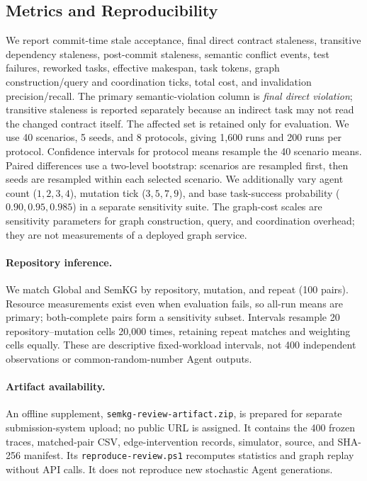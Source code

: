 \documentclass[a4paper,runningheads]{llncs}
\begin{document}
\subsection{Metrics and Reproducibility}
We report commit-time stale acceptance, final direct contract staleness, transitive dependency staleness, post-commit staleness, semantic conflict events, test failures, reworked tasks, effective makespan, task tokens, graph construction/query and coordination ticks, total cost, and invalidation precision/recall. The primary semantic-violation column is \emph{final direct violation}; transitive staleness is reported separately because an indirect task may not read the changed contract itself. The affected set is retained only for evaluation. We use 40 scenarios, 5 seeds, and 8 protocols, giving 1,600 runs and 200 runs per protocol. Confidence intervals for protocol means resample the 40 scenario means. Paired differences use a two-level bootstrap: scenarios are resampled first, then seeds are resampled within each selected scenario. We additionally vary agent count ($1,2,3,4$), mutation tick ($3,5,7,9$), and base task-success probability ($0.90,0.95,0.985$) in a separate sensitivity suite. The graph-cost scales are sensitivity parameters for graph construction, query, and coordination overhead; they are not measurements of a deployed graph service.

\paragraph{Repository inference.} We match Global and SemKG by repository, mutation, and repeat (100 pairs). Resource measurements exist even when evaluation fails, so all-run means are primary; both-complete pairs form a sensitivity subset. Intervals resample 20 repository--mutation cells 20,000 times, retaining repeat matches and weighting cells equally. These are descriptive fixed-workload intervals, not 400 independent observations or common-random-number Agent outputs.

\paragraph{Artifact availability.} An offline supplement, \texttt{semkg-review-artifact.zip}, is prepared for separate submission-system upload; no public URL is assigned. It contains the 400 frozen traces, matched-pair CSV, edge-intervention records, simulator, source, and SHA-256 manifest. Its \texttt{reproduce-review.ps1} recomputes statistics and graph replay without API calls. It does not reproduce new stochastic Agent generations.
\end{document}
